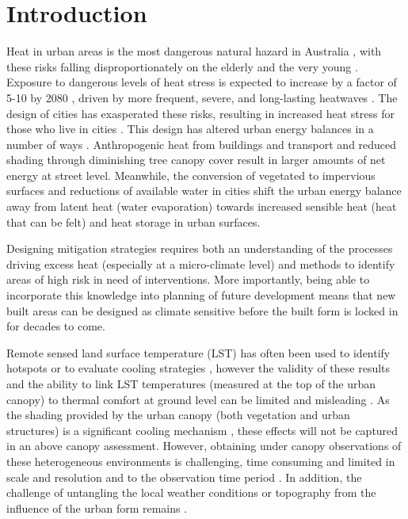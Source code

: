 \documentclass[final,3p,times,authoryear]{elsarticle}
\begin{document}
\section{Introduction}
Heat in urban areas is the most dangerous natural hazard in Australia \citep{Coates2014}, with these risks falling disproportionately on the elderly and the very young \citep{Nicholls2008}. Exposure to dangerous levels of heat stress is expected to increase by a factor of 5-10 by 2080 \citep{Coffel2018}, driven by more frequent, severe, and long-lasting heatwaves \citep{IPCC2013a}. The design of cities has exasperated these risks, resulting in increased heat stress for those who live in cities \citep{Coutts2012,Martilli2020}. This design has altered urban energy balances in a number of ways \citep{Oke1982}. Anthropogenic heat from buildings and transport and reduced shading through diminishing tree canopy cover result in larger amounts of net energy at street level. Meanwhile, the conversion of vegetated to impervious surfaces and reductions of available water in cities shift the urban energy balance away from latent heat (water evaporation) towards increased sensible heat (heat that can be felt) and heat storage in urban surfaces. 

Designing mitigation strategies requires both an understanding of the processes driving excess heat (especially at a micro-climate level) and methods to identify areas of high risk in need of interventions. More importantly, being able to incorporate this knowledge into planning of future development means that new built areas can be designed as climate sensitive before the built form is locked in for decades to come. 

Remote sensed land surface temperature (LST) has often been used to identify hotspots \citep{Aniello1995} or to evaluate cooling strategies \citep{Zhu2012a,Duncan2018,Manoli2019,Ossola2021}, however the validity of these results and the ability to link LST temperatures (measured at the top of the urban canopy) to thermal comfort at ground level can be limited and misleading  \citep{Coutts2016d}. As the shading provided by the urban canopy (both vegetation and urban structures) is a significant cooling mechanism \citep{Coutts2015,Lee2018,Krayenhoff2021}, these effects will not be captured in an above canopy assessment. However, obtaining under canopy observations of these heterogeneous environments is challenging, time consuming and limited in scale and resolution and to the observation time period \citep{Middel2019a}. In addition, the challenge of untangling the local weather conditions or topography from the influence of the urban form remains \citep{Potgieter2021}.
\end{document}

